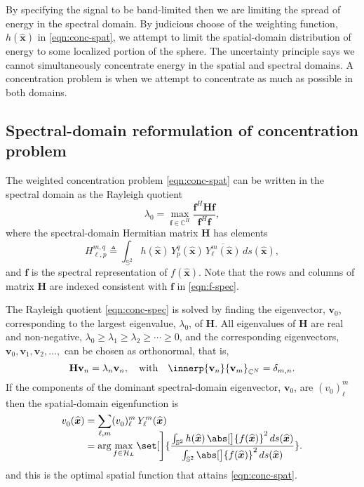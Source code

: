 \documentclass[10pt, twocolumn, twoside]{IEEEtran}
\newcommand{\untsph}{\mathbb{S}^{2}} %
\newcommand{\unit}[1]{\widehat{\bm{#1}}}
\newcommand{\cmplx}{\mathbb{C}} %
\newcommand{\dfn}{\triangleq}
\newcommand{\conj}[1]{\overline{#1}} %
\begin{document}
By specifying the signal to be band-limited then we are limiting the spread of energy in the spectral domain.  By judicious choose of the weighting function, $h(\unit{x})$ in \eqref{eqn:conc-spat}, we attempt to limit the spatial-domain distribution of energy to some localized portion of the sphere.  The uncertainty principle says we cannot simultaneously concentrate energy in the spatial and spectral domains.  A concentration problem is when we attempt to concentrate as much as possible in both domains.

\subsection{Spectral-domain reformulation of concentration problem}

The weighted concentration problem \eqref{eqn:conc-spat} can be written in the spectral domain as the Rayleigh quotient
\begin{equation}
\label{eqn:conc-spec}
	\lambda_0
	=\max_{\mathbf{f}\in\cmplx^{H}}\frac{\mathbf{f}^H\mathbf{H}\mathbf{f}}%
	{\mathbf{f}^H\mathbf{f}},
\end{equation}
where the spectral-domain Hermitian matrix $\mathbf{H}$ has elements
\begin{equation}
\label{eqn:W-matrix}
	H_{\ell,p}^{m,q} \dfn \int_{\untsph} h(\unit{x})\,Y_{p}^{q}(\unit{x})\,
		\conj{Y_{\ell}^{m}(\unit{x})}\,ds(\unit{x}),
\end{equation}
and $\mathbf{f}$ is the spectral representation of $f(\unit{x})$.  Note that the rows and columns of matrix $\mathbf{H}$ are indexed consistent with $\mathbf{f}$ in \eqref{eqn:f-spec}.

The Rayleigh quotient \eqref{eqn:conc-spec} is solved by finding the eigenvector, $\mathbf{v}_0$, corresponding to the largest eigenvalue, $\lambda_0$, of $\mathbf{H}$.  All eigenvalues of $\mathbf{H}$ are real and non-negative, $\lambda_0\geq\lambda_1\geq\lambda_2\geq\dotsb\geq0$, and the corresponding eigenvectors, $\mathbf{v}_0,\mathbf{v}_1, \mathbf{v}_2, \dotsc,$ can be chosen as orthonormal, that is,
\[
	\mathbf{H}\mathbf{v}_n=\lambda_n\mathbf{v}_n,\quad\text{with}\quad\innerp{\mathbf{v}_n}{\mathbf{v}_m}_{\cmplx^N}=\delta_{m,n}.
\]
If the components of the dominant spectral-domain eigenvector, $\mathbf{v}_0$, are $(v^{}_0)_{\ell}^{m}$ then the spatial-domain eigenfunction is
\begin{equation}
\label{eqn:spat-eigen}
\begin{split}
	v^{}_{0}(\unit{x})
	&=\smash{\sum_{\ell,m}} (v^{}_0)_{\ell}^{m}\, Y_{\ell}^{m}(\unit{x}) \\
	&=\arg\max_{f\in\mathcal{H}_{L}}
		\set[\Bigg]{\frac{\int_{\untsph} h(\unit{x})\,\abs[\big]{f(\unit{x})}^2\,ds(\unit{x})}%
		{\int_{\untsph} \abs[\big]{f(\unit{x})}^2\,ds(\unit{x})}}.
\end{split}
\end{equation}
and this is the optimal spatial function that attains \eqref{eqn:conc-spat}.
\end{document}
